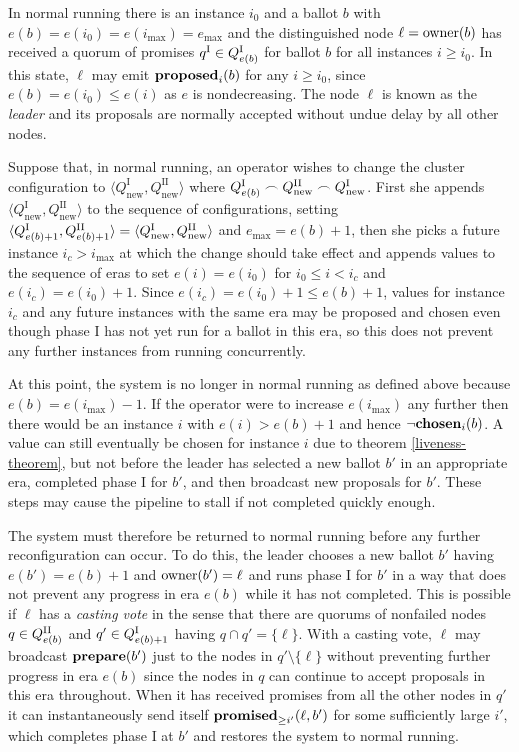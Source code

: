 \documentclass[journal]{IEEEtran}
\begin{document}
In normal running there is an instance $i_0$ and a ballot $b$ with ${e(b) =
e(i_0) = e(i_\mathrm{max}) = e_\mathrm{max}}$ and the distinguished node $\ell
= \mathrm{owner}(b)$ has received a quorum of promises $q^\textrm{I} \in {Q}^\textrm{I}_{e(b)}$ for
ballot $b$ for all instances $i \ge i_0$. In this state, $\ell$ may emit
$\mathbf{proposed}_{i}(b)$ for any $i \ge i_0$, since $e(b) = e(i_0) \le e(i)$ as $e$ is
nondecreasing.  The node $\ell$ is known as the \textit{leader} and its
proposals are normally accepted without undue delay by all other nodes.

\def\Qnew#1{Q^\textrm{#1}_\textrm{new}}

Suppose that, in normal running, an operator wishes to change the cluster
configuration to $\langle \Qnew{I}, \Qnew{II} \rangle$ where $\QI{e(b)} \frown
\Qnew{II} \frown \Qnew{I}$. First she appends $\langle \Qnew{I}, \Qnew{II}
\rangle$ to the sequence of configurations, setting $\langle \QI{e(b)+1},
\QII{e(b)+1} \rangle = \langle \Qnew{I}, \Qnew{II} \rangle$ and $e_\mathrm{max}
= e(b) + 1$, then she picks a future instance $i_c > i_\mathrm{max}$ at which
the change should take effect and appends values to the sequence of eras to set
$e(i) = e(i_0)$ for $i_0 \le i < i_c$ and $e(i_c) = e(i_0) + 1$.  Since $e(i_c)
= e(i_0) + 1 \le e(b) + 1$, values for instance $i_c$ and any future instances
with the same era may be proposed and chosen even though phase I has not yet
run for a ballot in this era, so this does not prevent any further instances
from running concurrently.

At this point, the system is no longer in normal running as defined above
because $e(b) = e(i_\mathrm{max}) - 1$. If the operator were to increase
$e(i_\mathrm{max})$ any further then there would be an instance $i$ with $e(i)
> e(b) + 1$ and hence $\neg\mathbf{chosen}_{i}(b)$. A value can still eventually be
chosen for instance $i$ due to theorem \ref{liveness-theorem}, but not before
the leader has selected a new ballot $b'$ in an appropriate era, completed
phase I for $b'$, and then broadcast new proposals for $b'$. These steps may
cause the pipeline to stall if not completed quickly enough.

The system must therefore be returned to normal running before any further
reconfiguration can occur. To do this, the leader chooses a new ballot $b'$
having $e(b') = e(b) + 1$ and $\mathrm{owner}(b') = \ell$ and runs phase I for $b'$ in
a way that does not prevent any progress in era $e(b)$ while it has not
completed. This is possible if $\ell$ has a \textit{casting vote} in the sense
that there are quorums of nonfailed nodes $q \in {Q}^\textrm{II}_{e(b)}$ and $q' \in
{Q}^\textrm{I}_{e(b)+1}$ having $q \cap q' = \{\ell\}$. With a casting vote, $\ell$ may
broadcast $\mathbf{prepare}(b')$ just to the nodes in $q' \setminus \{\ell\}$ without
preventing further progress in era $e(b)$ since the nodes in $q$ can continue
to accept proposals in this era throughout.  When it has received promises from
all the other nodes in $q'$ it can instantaneously send itself
$\mathbf{promised}_{\ge i'}(\ell,b')$ for some sufficiently large $i'$, which completes phase
I at $b'$ and restores the system to normal running.
\end{document}
